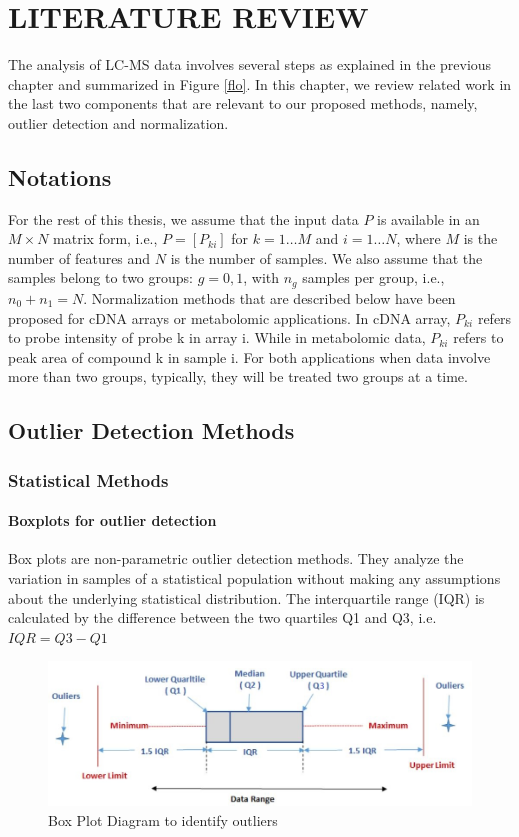 \chapter{LITERATURE REVIEW}
The analysis of LC-MS data involves several steps as explained in the previous chapter and summarized in Figure \ref{flo}. In this chapter, we review related work in the last two components that are relevant to our proposed methods, namely, outlier detection and normalization.
\section{Notations}

For the rest of this thesis, we assume that the input data $P$ is available in an $ M \times N$ matrix form, i.e., $P=[P_{ki}]$ for $ k=1\dots M$ and $i=1 \dots N$, where $M$ is the number of features and $N$ is the number of samples. We also assume that the samples belong to two groups: $g=0,1$, with $n_g$ samples per group, i.e., $n_0+n_1=N$. Normalization methods that are described below have been proposed for cDNA arrays or metabolomic applications. In cDNA array, $P_{ki}$ refers to probe intensity of probe k in array i. While in metabolomic data, $P_{ki}$ refers to peak area of compound k in sample i. For both applications when data involve more than two groups, typically, they will be treated two groups at a time.



\section{Outlier Detection Methods}

\subsection{ Statistical Methods}
\subsubsection{Boxplots for outlier detection}

\indent Box plots \cite{tukey} are non-parametric outlier detection methods. They analyze the variation in samples of a statistical population without making any assumptions about the underlying statistical distribution.  The interquartile range (IQR) is calculated by the difference between the two quartiles Q1 and Q3, i.e. $IQR = Q3 - Q1 $


\begin{figure}
	\centering
	\includegraphics[width=15cm]{boxplot}
	\caption{Box Plot Diagram to identify outliers }
	\label{box}
\end{figure}


